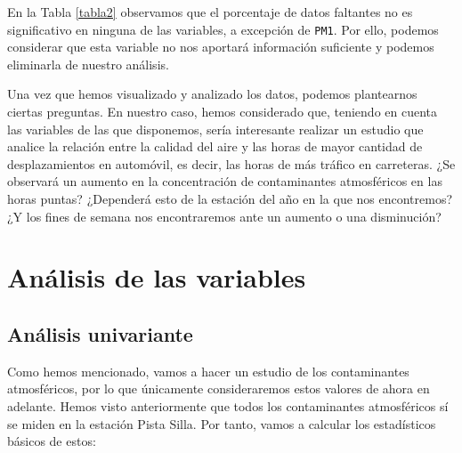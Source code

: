 \documentclass[
]{article}
\begin{document}
En la Tabla \ref{tabla2} observamos que el porcentaje de datos faltantes
no es significativo en ninguna de las variables, a excepción de
\texttt{PM1}. Por ello, podemos considerar que esta variable no nos
aportará información suficiente y podemos eliminarla de nuestro
análisis.

Una vez que hemos visualizado y analizado los datos, podemos plantearnos
ciertas preguntas. En nuestro caso, hemos considerado que, teniendo en
cuenta las variables de las que disponemos, sería interesante realizar
un estudio que analice la relación entre la calidad del aire y las horas
de mayor cantidad de desplazamientos en automóvil, es decir, las horas
de más tráfico en carreteras. ¿Se observará un aumento en la
concentración de contaminantes atmosféricos en las horas puntas?
¿Dependerá esto de la estación del año en la que nos encontremos? ¿Y los
fines de semana nos encontraremos ante un aumento o una disminución?

\hypertarget{anuxe1lisis-de-las-variables}{%
\section{Análisis de las variables}\label{anuxe1lisis-de-las-variables}}

\hypertarget{anuxe1lisis-univariante}{%
\subsection{Análisis univariante}\label{anuxe1lisis-univariante}}

Como hemos mencionado, vamos a hacer un estudio de los contaminantes
atmosféricos, por lo que únicamente consideraremos estos valores de
ahora en adelante. Hemos visto anteriormente que todos los contaminantes
atmosféricos sí se miden en la estación Pista Silla. Por tanto, vamos a
calcular los estadísticos básicos de estos:
\end{document}
